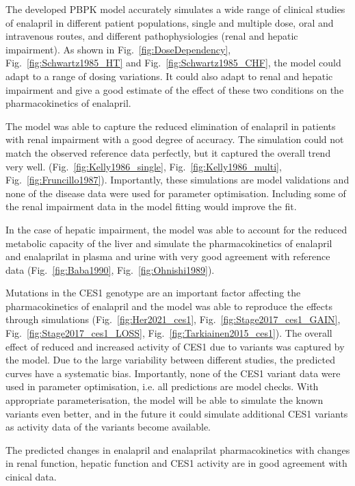 \documentclass[pharmaceutics,article,submit,pdftex,moreauthors]{Definitions/mdpi}
\begin{document}
The developed PBPK model accurately simulates a wide range of clinical studies of enalapril in different patient populations, single and multiple dose, oral and intravenous routes, and different pathophysiologies (renal and hepatic impairment). As shown in Fig.~\ref{fig:DoseDependency}, Fig.~\ref{fig:Schwartz1985_HT} and Fig.~\ref{fig:Schwartz1985_CHF}, the model could adapt to a range of dosing variations. It could also adapt to renal and hepatic impairment and give a good estimate of the effect of these two conditions on the pharmacokinetics of enalapril. 

The model was able to capture the reduced elimination of enalapril in patients with renal impairment with a good degree of accuracy. The simulation could not match the observed reference data perfectly, but it captured the overall trend very well. (Fig.~\ref{fig:Kelly1986_single}, Fig.~\ref{fig:Kelly1986_multi}, Fig.~\ref{fig:Fruncillo1987}). Importantly, these simulations are model validations and none of the disease data were used for parameter optimisation. Including some of the renal impairment data in the model fitting would improve the fit.

In the case of hepatic impairment, the model was able to account for the reduced metabolic capacity of the liver and simulate the pharmacokinetics of enalapril and enalaprilat in plasma and urine with very good agreement with reference data (Fig.~\ref{fig:Baba1990}, Fig.~\ref{fig:Ohnishi1989}).

Mutations in the CES1 genotype are an important factor affecting the pharmacokinetics of enalapril and the model was able to reproduce the effects through simulations (Fig.~\ref{fig:Her2021_ces1}, Fig.~\ref{fig:Stage2017_ces1_GAIN}, Fig.~\ref{fig:Stage2017_ces1_LOSS}, Fig.~\ref{fig:Tarkiainen2015_ces1}). The overall effect of reduced and increased activity of CES1 due to variants was captured by the model. Due to the large variability between different studies, the predicted curves have a systematic bias. Importantly, none of the CES1 variant data were used in parameter optimisation, i.e. all predictions are model checks. With appropriate parameterisation, the model will be able to simulate the known variants even better, and in the future it could simulate additional CES1 variants as activity data of the variants become available. 

The predicted changes in enalapril and enalaprilat pharmacokinetics with changes in renal function, hepatic function and CES1 activity are in good agreement with cinical data.
\end{document}
